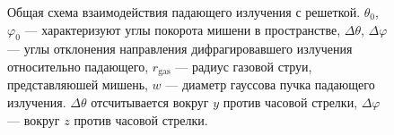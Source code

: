     \begin{figure}[ht]
        \hfil
        \caption{Общая схема взаимодействия падающего излучения с решеткой. $\theta_0$, $\varphi_0$ --- характеризуют углы покорота мишени в пространстве, $\Delta \theta$, $\Delta \varphi$ --- углы отклонения направления дифрагировавшего излучения относительно падающего, $r_{\textrm{gas}}$ --- радиус газовой струи, представляюшей мишень, $w$ --- диаметр гауссова пучка падающего излучения. $\Delta \theta$ отсчитывается вокруг $y$ против часовой стрелки, $\Delta \varphi$ --- вокруг $z$ против часовой стрелки.}\label{3ddiffr:image}
    \end{figure}






